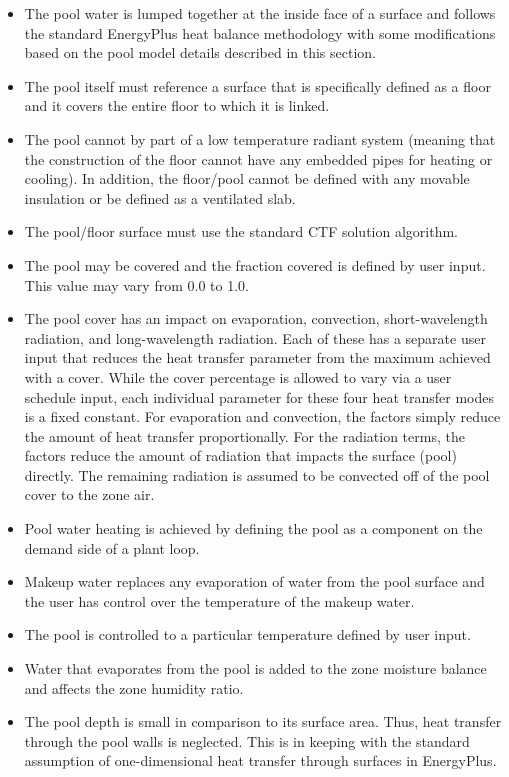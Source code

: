 \begin{itemize}
\tightlist
\item
  The pool water is lumped together at the inside face of a surface and follows the standard EnergyPlus heat balance methodology with some modifications based on the pool model details described in this section.
\item
  The pool itself must reference a surface that is specifically defined as a floor and it covers the entire floor to which it is linked.
\item
  The pool cannot by part of a low temperature radiant system (meaning that the construction of the floor cannot have any embedded pipes for heating or cooling). In addition, the floor/pool cannot be defined with any movable insulation or be defined as a ventilated slab.
\item
  The pool/floor surface must use the standard CTF solution algorithm.
\item
  The pool may be covered and the fraction covered is defined by user input. This value may vary from 0.0 to 1.0.
\item
  The pool cover has an impact on evaporation, convection, short-wavelength radiation, and long-wavelength radiation. Each of these has a separate user input that reduces the heat transfer parameter from the maximum achieved with a cover. While the cover percentage is allowed to vary via a user schedule input, each individual parameter for these four heat transfer modes is a fixed constant. For evaporation and convection, the factors simply reduce the amount of heat transfer proportionally. For the radiation terms, the factors reduce the amount of radiation that impacts the surface (pool) directly. The remaining radiation is assumed to be convected off of the pool cover to the zone air.
\item
  Pool water heating is achieved by defining the pool as a component on the demand side of a plant loop.
\item
  Makeup water replaces any evaporation of water from the pool surface and the user has control over the temperature of the makeup water.
\item
  The pool is controlled to a particular temperature defined by user input.
\item
  Water that evaporates from the pool is added to the zone moisture balance and affects the zone humidity ratio.
\item
  The pool depth is small in comparison to its surface area. Thus, heat transfer through the pool walls is neglected. This is in keeping with the standard assumption of one-dimensional heat transfer through surfaces in EnergyPlus.
\end{itemize}

